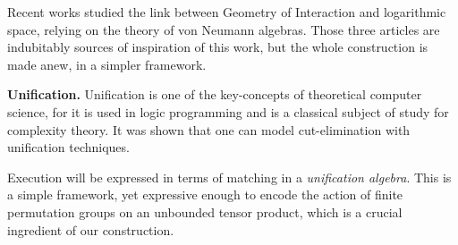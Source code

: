 Recent works \cite{girard_normativity_2012,aubert_characterizing_2012,seiller_logarithmic_2013} studied the link between Geometry of Interaction and logarithmic space, relying on the theory of von Neumann algebras.
Those three articles are indubitably sources of inspiration of this work, but the whole construction is made anew, in a simpler framework.
%

\smallskip\noindent
\textbf{Unification.} 
Unification is one of the key-concepts of theoretical computer science, for it is used in logic programming and is a classical subject of study for complexity theory.
It was shown \cite{girard_geometry_1995,girard_three_lightings} that one can model \hbox{cut-elimination} with unification techniques.
%

Execution will be expressed in terms of matching in a \emph{unification algebra}.
This is a simple framework, yet expressive enough to encode the action of finite permutation groups on an unbounded tensor product, which is a crucial ingredient of our construction.
%

